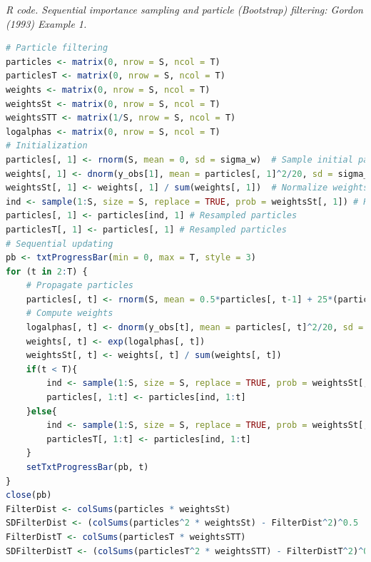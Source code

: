 \begin{enumerate}[leftmargin=*]
\begin{tcolorbox}[enhanced,width=4.67in,center upper,
	fontupper=\large\bfseries,drop shadow southwest,sharp corners]
	\textit{R code. Sequential importance sampling and particle (Bootstrap) filtering: Gordon (1993) Example 1.}
	\begin{VF}
		\begin{lstlisting}[language=R]
# Particle filtering
particles <- matrix(0, nrow = S, ncol = T) 
particlesT <- matrix(0, nrow = S, ncol = T)
weights <- matrix(0, nrow = S, ncol = T) 
weightsSt <- matrix(0, nrow = S, ncol = T) 
weightsSTT <- matrix(1/S, nrow = S, ncol = T) 
logalphas <- matrix(0, nrow = S, ncol = T) 
# Initialization
particles[, 1] <- rnorm(S, mean = 0, sd = sigma_w)  # Sample initial particles
weights[, 1] <- dnorm(y_obs[1], mean = particles[, 1]^2/20, sd = sigma_mu)  # Importance weights
weightsSt[, 1] <- weights[, 1] / sum(weights[, 1])  # Normalize weights
ind <- sample(1:S, size = S, replace = TRUE, prob = weightsSt[, 1]) # Resample 
particles[, 1] <- particles[ind, 1] # Resampled particles
particlesT[, 1] <- particles[, 1] # Resampled particles
# Sequential updating
pb <- txtProgressBar(min = 0, max = T, style = 3)
for (t in 2:T) {
	# Propagate particles
	particles[, t] <- rnorm(S, mean = 0.5*particles[, t-1] + 25*(particles[, t-1]/(1+particles[, t-1]^2)) + 8*cos(1.2*t), sd = sigma_w)
	# Compute weights
	logalphas[, t] <- dnorm(y_obs[t], mean = particles[, t]^2/20, sd = sigma_mu, log = TRUE) 
	weights[, t] <- exp(logalphas[, t])
	weightsSt[, t] <- weights[, t] / sum(weights[, t])
	if(t < T){
		ind <- sample(1:S, size = S, replace = TRUE, prob = weightsSt[, t])
		particles[, 1:t] <- particles[ind, 1:t]
	}else{
		ind <- sample(1:S, size = S, replace = TRUE, prob = weightsSt[, t])
		particlesT[, 1:t] <- particles[ind, 1:t]
	}
	setTxtProgressBar(pb, t)
}
close(pb)
FilterDist <- colSums(particles * weightsSt)
SDFilterDist <- (colSums(particles^2 * weightsSt) - FilterDist^2)^0.5
FilterDistT <- colSums(particlesT * weightsSTT)
SDFilterDistT <- (colSums(particlesT^2 * weightsSTT) - FilterDistT^2)^0.5
\end{lstlisting}
	\end{VF}
\end{tcolorbox}  


\end{enumerate}
